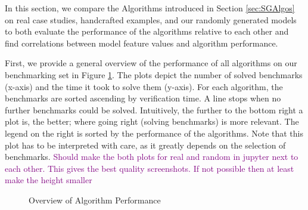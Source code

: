 In this section, we compare the Algorithms introduced in Section \ref{sec:SGAlgos} on real case studies, handcrafted examples, and our randomly generated models to both evaluate the 
performance of the algorithms relative to each other and find correlations between model feature values and algorithm performance.

First, we provide a general overview of the performance of all algorithms on our benchmarking set in Figure \ref{fig:AlgoPerformance}.
The plots depict the number of solved benchmarks (x-axis) and the time it took to solve them (y-axis). 
For each algorithm, the benchmarks are sorted ascending by verification time. A line stops when no further benchmarks could be solved.
Intuitively, the further to the bottom right a plot is, the better; where going right (solving benchmarks) is more relevant.
The legend on the right is sorted by the performance of the algorithms.
Note that this plot has to be interpreted with care, as it greatly depends on the selection of benchmarks.
\textcolor{purple}{Should make the both plots for real and random in jupyter next to each other. This gives the best quality screenshots. If not possible then at least make the height smaller}
\begin{figure}
    \centering
    \qquad
    \caption[Overview of Algorithm Performance]{Overview of Algorithm Performance}%
    \label{fig:AlgoPerformance}
\end{figure}

